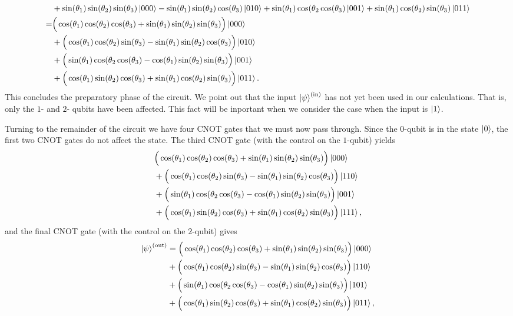 \documentclass[reqno]{amsart}
\numberwithin{lemma}{section}
\numberwithin{proposition}{section}
\newcommand{\out}{\textnormal{out}}
\begin{document}
{\begin{align*}
& + \sin(\theta_{1}) \sin(\theta_{2}) \sin(\theta_{3}) \ket{000} - \sin(\theta_{1}) \sin(\theta_{2}) \cos(\theta_{3}) \ket{010} + \sin(\theta_{1}) \cos(\theta_{2} \cos(\theta_{3}) \ket{001} + \sin(\theta_{1}) \cos(\theta_{2}) \sin(\theta_{3}) \ket{011}\\
= & \Big ( \cos(\theta_{1}) \cos(\theta_{2}) \cos(\theta_{3}) + \sin(\theta_{1}) \sin(\theta_{2}) \sin(\theta_{3}) \Big ) \ket{000}\\
& + \Big (\cos(\theta_{1}) \cos(\theta_{2}) \sin(\theta_{3}) - \sin(\theta_{1}) \sin(\theta_{2}) \cos(\theta_{3}) \Big ) \ket{010}\\
& + \Big ( \sin(\theta_{1}) \cos(\theta_{2} \cos(\theta_{3}) - \cos(\theta_{1}) \sin(\theta_{2}) \sin(\theta_{3}) \Big ) \ket{001}\\
& + \Big ( \cos(\theta_{1}) \sin(\theta_{2}) \cos(\theta_{3}) + \sin(\theta_{1}) \cos(\theta_{2}) \sin(\theta_{3}) \Big ) \ket{011}.
\end{align*}
This concludes the preparatory phase of the circuit. We point out that the input $\ket{\psi}^{(\textnormal{in})}$ has not yet been used in our calculations. That is, only the $1$- and $2$- qubits have been affected. This fact will be inportant when we consider the case when the input is $\ket{1}$.

Turning to the remainder of the circuit we have four CNOT gates that we must now pass through. Since the $0$-qubit is in the state $\ket{0}$, the first two CNOT gates do not affect the state. The third CNOT gate (with the control on the $1$-qubit) yields
\begin{align*}
& \Big ( \cos(\theta_{1}) \cos(\theta_{2}) \cos(\theta_{3}) + \sin(\theta_{1}) \sin(\theta_{2}) \sin(\theta_{3}) \Big ) \ket{000}\\
& + \Big (\cos(\theta_{1}) \cos(\theta_{2}) \sin(\theta_{3}) - \sin(\theta_{1}) \sin(\theta_{2}) \cos(\theta_{3}) \Big ) \ket{110}\\
& + \Big ( \sin(\theta_{1}) \cos(\theta_{2} \cos(\theta_{3}) - \cos(\theta_{1}) \sin(\theta_{2}) \sin(\theta_{3}) \Big ) \ket{001}\\
& + \Big ( \cos(\theta_{1}) \sin(\theta_{2}) \cos(\theta_{3}) + \sin(\theta_{1}) \cos(\theta_{2}) \sin(\theta_{3}) \Big ) \ket{111},
\end{align*}
and the final CNOT gate (with the control on the $2$-qubit) gives
\begin{align*}
\ket{\psi}^{(\out)} &=  \Big ( \cos(\theta_{1}) \cos(\theta_{2}) \cos(\theta_{3}) + \sin(\theta_{1}) \sin(\theta_{2}) \sin(\theta_{3}) \Big ) \ket{000}\\
& + \Big (\cos(\theta_{1}) \cos(\theta_{2}) \sin(\theta_{3}) - \sin(\theta_{1}) \sin(\theta_{2}) \cos(\theta_{3}) \Big ) \ket{110}\\
& + \Big ( \sin(\theta_{1}) \cos(\theta_{2} \cos(\theta_{3}) - \cos(\theta_{1}) \sin(\theta_{2}) \sin(\theta_{3}) \Big ) \ket{101}\\
& + \Big ( \cos(\theta_{1}) \sin(\theta_{2}) \cos(\theta_{3}) + \sin(\theta_{1}) \cos(\theta_{2}) \sin(\theta_{3}) \Big ) \ket{011},
\end{align*}

}
\end{document}
